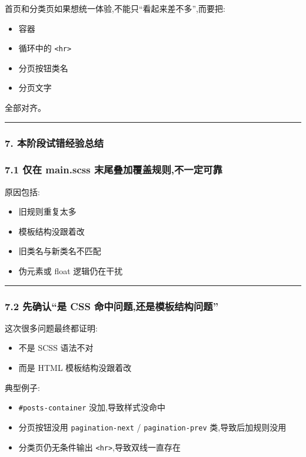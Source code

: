 \documentclass[lang=cn,scheme=chinese,color=blue,device=normal,toc=onecol,math=cm]{elegantbook}
\begin{document}
首页和分类页如果想统一体验,不能只“看起来差不多”,而要把:\par


\begin{itemize}
\item 容器
\item 循环中的 \texttt{<hr>}
\item 分页按钮类名
\item 分页文字
\end{itemize}


全部对齐。\par


\medskip\hrule\medskip


\subsubsection{7. 本阶段试错经验总结}


\subsubsection{7.1 仅在 main.scss 末尾叠加覆盖规则,不一定可靠}


原因包括:\par


\begin{itemize}
\item 旧规则重复太多
\item 模板结构没跟着改
\item 旧类名与新类名不匹配
\item 伪元素或 float 逻辑仍在干扰
\end{itemize}


\medskip\hrule\medskip


\subsubsection{7.2 先确认“是 CSS 命中问题,还是模板结构问题”}


这次很多问题最终都证明:\par


\begin{itemize}
\item 不是 SCSS 语法不对
\item 而是 HTML 模板结构没跟着改
\end{itemize}


典型例子:\par


\begin{itemize}
\item \texttt{\#posts-container} 没加,导致样式没命中
\item 分页按钮没用 \texttt{pagination-next} /\allowbreak{} \texttt{pagination-prev} 类,导致后加规则没用
\item 分类页仍无条件输出 \texttt{<hr>},导致双线一直存在
\end{itemize}
\end{document}
